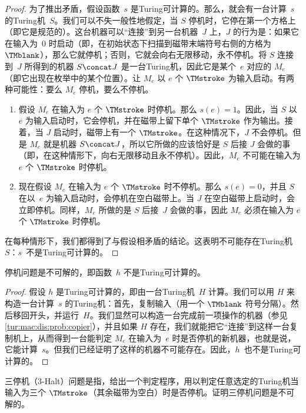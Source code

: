 \documentclass[../../../include/open-logic-section]{subfiles}
\begin{document}
\begin{proof}
为了推出矛盾，假设函数~$s$ 是Turing可计算的。那么，就会有一台计算~$s$ 的Turing机~$S$。我们可以不失一般性地假定，当 $S$ 停机时，它停在第一个方格上（即它是规范的）。这台机器可以“连接”到另一台机器~$J$ 上，$J$ 的行为是：如果它在输入为~0 时启动（即，在初始状态下扫描到磁带末端符号右侧的方格为 $\TMblank$），那么它就停机；否则，它就会向右无限移动，永不停机。将 $S$ 连接到~$J$ 所得到的机器 $S \concat J$ 是一台Turing机，因此它是某个~$e$ 对应的 $M_e$（即它出现在枚举中的某个位置）。让 $M_e$ 以 $e$ 个 $\TMstroke$ 为输入启动。有两种可能性：要么 $M_e$ 停机，要么不停机。
\begin{enumerate}
\item 假设 $M_e$ 在输入为 $e$ 个 $\TMstroke$ 时停机。那么 $s(e) = 1$。因此，当 $S$ 以~$e$ 为输入启动时，它会停机，并在磁带上留下单个 $\TMstroke$ 作为输出。接着，当 $J$ 启动时，磁带上有一个 $\TMstroke$。在这种情况下，$J$ 不会停机。但是 $M_e$ 就是机器 $S \concat J$，所以它所做的应该恰好是 $S$ 后接 $J$ 会做的事（即，在这种情形下，向右无限移动且永不停机）。因此，$M_e$ 不可能在输入为 $e$ 个 $\TMstroke$ 时停机。

\item 现在假设 $M_e$ 在输入为 $e$ 个 $\TMstroke$ 时不停机。那么 $s(e) = 0$，并且 $S$ 在以~$e$ 为输入启动时，会停机在空白磁带上。当 $J$ 在空白磁带上启动时，会立即停机。同样，$M_e$ 所做的是 $S$ 后接~$J$ 会做的事，因此 $M_e$ 必须在输入为 $e$ 个 $\TMstroke$ 时停机。
\end{enumerate}
在每种情形下，我们都得到了与假设相矛盾的结论。这表明不可能存在Turing机~$S$：$s$~不是Turing可计算的。
\end{proof}

\begin{thm}[停机问题的不可解性]
 停机问题是不可解的，即函数~$h$ 不是Turing可计算的。
\end{thm}

\begin{proof}
假设 $h$ 是Turing可计算的，即由一台Turing机~$H$ 计算。我们可以用 $H$ 来构造一台计算~$s$ 的Turing机：首先，复制输入（用一个 $\TMblank$ 符号分隔）。然后移回开头，并运行~$H$。我们显然可以构造一台完成前一项操作的机器（参见 \cref{tur:mac:dis:prob:copier}），并且如果 $H$ 存在，我们就能把它“连接”到这样一台复制机上，从而得到一台能判定 $M_e$ 在输入为~$e$ 时是否停机的新机器，也就是说，它能计算~$s$。但我们已经证明了这样的机器不可能存在。因此，$h$~也不是Turing可计算的。
\end{proof}

\begin{prob}
三停机（3-Halt）问题是指，给出一个判定程序，用以判定任意选定的Turing机当输入为三个 $\TMstroke$（其余磁带为空白）时是否停机。证明三停机问题是不可解的。
\end{prob}
\end{document}
